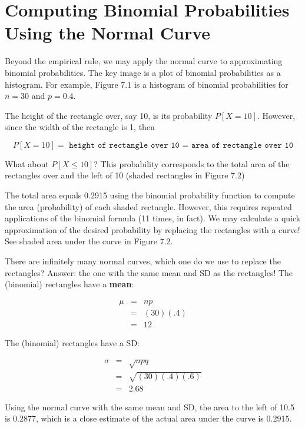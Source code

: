 \documentclass[11pt, chapterprefix=true]{scrbook}\usepackage[]{graphicx}\usepackage[]{color}
\begin{document}
\section{Computing Binomial Probabilities Using the Normal Curve}

Beyond the empirical rule, we may apply the normal curve to approximating binomial probabilities.  The key image is a plot of binomial probabilities as a histogram.  For example, Figure 7.1 is a histogram of binomial probabilities for $n = 30$ and $p = 0.4$.

The height of the rectangle over, say 10, is its probability $P[X = 10]$.  However, since the width of the rectangle is 1, then

\begin{equation*}
P[X = 10] = \texttt{ height of rectangle over 10 = area of rectangle over 10}
\end{equation*}

What about $P[X \le 10]$?  This probability corresponds to the total area of the rectangles over and the left of 10 (shaded rectangles in Figure 7.2)

The total area equals 0.2915 using the binomial probability function to compute the area (probability) of each shaded rectangle.  However, this requires repeated applications of the binomial formula (11 times, in fact).  We may calculate a quick approximation of the desired probability by replacing the rectangles with a curve!  See shaded area under the curve in Figure 7.2.

There are infinitely many normal curves, which one do we use to replace the rectangles?  Answer: the one with the same mean and SD as the rectangles!  The (binomial) rectangles have a \textbf{mean}:

\begin{eqnarray*}
\mu &=& np \\
  &=& (30)(.4) \\
  &=& 12
\end{eqnarray*}

The (binomial) rectangles have a SD:

\begin{eqnarray*}
\sigma &=& \sqrt{npq} \\
  &=& \sqrt{(30)(.4)(.6)} \\
  &=& 2.68
\end{eqnarray*}

Using the normal curve with the same mean and SD, the area to the left of 10.5 is 0.2877, which is a close estimate of the actual area under the curve is 0.2915.
\end{document}
